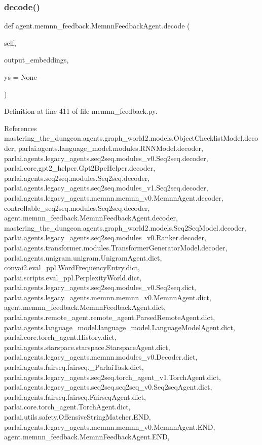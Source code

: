 \subsubsection{\texorpdfstring{decode()}{decode()}}
{\footnotesize\ttfamily def agent.\+memnn\+\_\+feedback.\+Memnn\+Feedback\+Agent.\+decode (\begin{DoxyParamCaption}\item[{}]{self,  }\item[{}]{output\+\_\+embeddings,  }\item[{}]{ys = {\ttfamily None} }\end{DoxyParamCaption})}



Definition at line 411 of file memnn\+\_\+feedback.\+py.



References mastering\+\_\+the\+\_\+dungeon.\+agents.\+graph\+\_\+world2.\+models.\+Object\+Checklist\+Model.\+decoder, parlai.\+agents.\+language\+\_\+model.\+modules.\+R\+N\+N\+Model.\+decoder, parlai.\+agents.\+legacy\+\_\+agents.\+seq2seq.\+modules\+\_\+v0.\+Seq2seq.\+decoder, parlai.\+core.\+gpt2\+\_\+helper.\+Gpt2\+Bpe\+Helper.\+decoder, parlai.\+agents.\+seq2seq.\+modules.\+Seq2seq.\+decoder, parlai.\+agents.\+legacy\+\_\+agents.\+seq2seq.\+modules\+\_\+v1.\+Seq2seq.\+decoder, parlai.\+agents.\+legacy\+\_\+agents.\+memnn.\+memnn\+\_\+v0.\+Memnn\+Agent.\+decoder, controllable\+\_\+seq2seq.\+modules.\+Seq2seq.\+decoder, agent.\+memnn\+\_\+feedback.\+Memnn\+Feedback\+Agent.\+decoder, mastering\+\_\+the\+\_\+dungeon.\+agents.\+graph\+\_\+world2.\+models.\+Seq2\+Seq\+Model.\+decoder, parlai.\+agents.\+legacy\+\_\+agents.\+seq2seq.\+modules\+\_\+v0.\+Ranker.\+decoder, parlai.\+agents.\+transformer.\+modules.\+Transformer\+Generator\+Model.\+decoder, parlai.\+agents.\+unigram.\+unigram.\+Unigram\+Agent.\+dict, convai2.\+eval\+\_\+ppl.\+Word\+Frequency\+Entry.\+dict, parlai.\+scripts.\+eval\+\_\+ppl.\+Perplexity\+World.\+dict, parlai.\+agents.\+legacy\+\_\+agents.\+seq2seq.\+modules\+\_\+v0.\+Seq2seq.\+dict, parlai.\+agents.\+legacy\+\_\+agents.\+memnn.\+memnn\+\_\+v0.\+Memnn\+Agent.\+dict, agent.\+memnn\+\_\+feedback.\+Memnn\+Feedback\+Agent.\+dict, parlai.\+agents.\+remote\+\_\+agent.\+remote\+\_\+agent.\+Parsed\+Remote\+Agent.\+dict, parlai.\+agents.\+language\+\_\+model.\+language\+\_\+model.\+Language\+Model\+Agent.\+dict, parlai.\+core.\+torch\+\_\+agent.\+History.\+dict, parlai.\+agents.\+starspace.\+starspace.\+Starspace\+Agent.\+dict, parlai.\+agents.\+legacy\+\_\+agents.\+memnn.\+modules\+\_\+v0.\+Decoder.\+dict, parlai.\+agents.\+fairseq.\+fairseq.\+\_\+\+Parlai\+Task.\+dict, parlai.\+agents.\+legacy\+\_\+agents.\+seq2seq.\+torch\+\_\+agent\+\_\+v1.\+Torch\+Agent.\+dict, parlai.\+agents.\+legacy\+\_\+agents.\+seq2seq.\+seq2seq\+\_\+v0.\+Seq2seq\+Agent.\+dict, parlai.\+agents.\+fairseq.\+fairseq.\+Fairseq\+Agent.\+dict, parlai.\+core.\+torch\+\_\+agent.\+Torch\+Agent.\+dict, parlai.\+utils.\+safety.\+Offensive\+String\+Matcher.\+E\+ND, parlai.\+agents.\+legacy\+\_\+agents.\+memnn.\+memnn\+\_\+v0.\+Memnn\+Agent.\+E\+ND, agent.\+memnn\+\_\+feedback.\+Memnn\+Feedback\+Agent.\+E\+ND, 